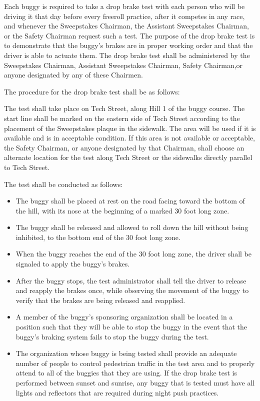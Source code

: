 Each buggy is required to take a drop brake test with each person who will be driving it that day before every freeroll practice, after it competes in any race, and whenever the Sweepstakes Chairman, the Assistant Sweepstakes Chairman, or the Safety Chairman request such a test. The purpose of the drop brake test is to demonstrate that the buggy's brakes are in proper working order and that the driver is able to actuate them. The drop brake test shall be administered by the Sweepstakes Chairman, Assistant Sweepstakes Chairman, Safety Chairman,or anyone designated by any of these Chairmen.

The procedure for the drop brake test shall be as follows:

The test shall take place on Tech Street, along Hill 1 of the buggy course. The start line shall be marked on the eastern side of Tech Street according to the placement of the Sweepstakes plaque in the sidewalk. The area will be used if it is available and is in acceptable condition. If this area is not available or acceptable, the Safety Chairman, or anyone designated by that Chairman, shall choose an alternate location for the test along Tech Street or the sidewalks directly parallel to Tech Street.

The test shall be conducted as follows:
\begin{itemize}
	\item The buggy shall be placed at rest on the road facing toward the bottom of the hill, with its nose at the beginning of a marked 30 foot long zone.

	\item The buggy shall be released and allowed to roll down the hill without being inhibited, to the bottom end of the 30 foot long zone.
 
	\item When the buggy reaches the end of the 30 foot long zone, the driver shall be signaled to apply the buggy's brakes.
 
	\item After the buggy stops, the test administrator shall tell the driver to release and reapply the brakes once, while observing the movement of the buggy to verify that the brakes are being released and reapplied.
 
	\item A member of the buggy's sponsoring organization shall be located in a position such that they will be able to stop the buggy in the event that the buggy's braking system fails to stop the buggy during the test.
 
	\item The organization whose buggy is being tested shall provide an adequate number of people to control pedestrian traffic in the test area and to properly attend to all of the buggies that they are using. If the drop brake test is performed between sunset and sunrise, any buggy that is tested must have all lights and reflectors that are required during night push practices.
\end{itemize}

